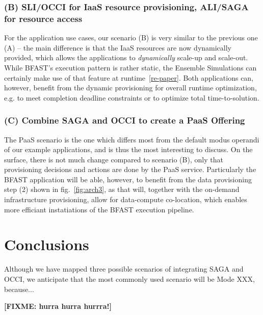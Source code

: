 \documentclass[10pt,conference,final,letterpaper,twoside,twocolumn,]{IEEEtran}
\newcommand{\I}[1]{\textit{#1}}
\newcommand{\B}[1]{\textbf{#1}}
\newcommand{\F}[1]{\B{[FIXME: #1]}}
\begin{document}
 \subsubsection*{(B) SLI/OCCI for IaaS resource provisioning, ALI/SAGA for
 resource access} 

 For the application use cases, our scenario (B) is very similar to
 the previous one (A) -- the main difference is that the IaaS
 resources are now dynamically provided, which allows the applications
 to \I{dynamically} scale-up and scale-out.  While BFAST's execution
 pattern is rather static, the Ensemble Simulations can certainly make
 use of that feature at runtime~\ref{re-paper}.  Both applications
 can, however, benefit from the dynamic provisioning for overall
 runtime optimization, e.g. to meet completion deadline constraints or
 to optimize total time-to-solution.


 \subsubsection*{(C) Combine SAGA and OCCI to create a PaaS Offering}

 The PaaS scenario is the one which differs most from the default
 modus operandi of our example applications, and is thus the most
 interesting to discuss.  On the surface, there is not much change
 compared to scenario (B), only that provisioning decisions and
 actions are done by the PaaS service.  Particularly the BFAST
 application will be able, however, to benefit from the data
 provisioning step (2) shown in fig.~\ref{fig:arch3}, as that will,
 together with the on-demand infrastructure provisioning, allow for
 data-compute co-location, which enables more efficiant instatiations
 of the BFAST execution pipeline.


\section{Conclusions}

 Although we have mapped three possible scenarios of integrating SAGA
 and OCCI, we anticipate that the most commonly used scenario will be
 Mode XXX, because...


\label{sec:conc}

 \F{hurra hurra hurrra!}




\end{document}
